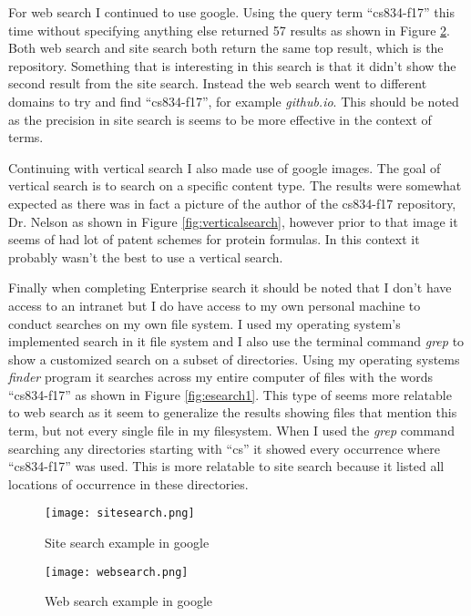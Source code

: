 \documentclass[letterpaper,11pt]{article}
\begin{document}
For web search I continued to use google. Using the query term ``cs834-f17'' this time without specifying anything else returned 57 results as shown in Figure \ref{fig:websearch}.
Both web search and site search both return the same top result, which is the repository. Something that is interesting in this search is that it didn't show the second result
from the site search. Instead the web search went to different domains to try and find ``cs834-f17'', for example \textit{github.io}. This should be noted as the precision in site search
is seems to be more effective in the context of terms.

Continuing with vertical search I also made use of google images. The goal of vertical search is to search on a specific content type.
The results were somewhat expected as there was in fact a picture of the author of the cs834-f17 repository, Dr. Nelson as shown in Figure \ref{fig:verticalsearch}, however prior to that image it seems of had lot of patent schemes for protein formulas. In this context it probably wasn't the best to use a vertical search.

Finally when completing Enterprise search it should be noted that I don't have access to an intranet but I do have access to my own personal machine to conduct searches on my own file system.
I used my operating system's implemented search in it file system and I also use the terminal command \textit{grep} to show a customized search on a subset of directories.
Using my operating systems \textit{finder} program it searches across my entire computer of files with the words ``cs834-f17'' as shown in Figure \ref{fig:esearch1}. This type of seems more relatable to web search as it seem to generalize the results showing files that mention this term, but not every single file in my filesystem.
When I used the \textit{grep} command searching any directories starting with ``cs'' it showed every occurrence where ``cs834-f17'' was used. This is more relatable to site search because it listed all locations of occurrence in these directories.

  \begin{figure}[h]
  \centering
  \texttt{[image: sitesearch.png]}
  \caption{Site search example in google}
  \label{fig:sitesearch}
  \end{figure}

  \begin{figure}[h]
  \centering
  \texttt{[image: websearch.png]}
  \caption{Web search example in google}
  \label{fig:websearch}
  \end{figure}
\end{document}
